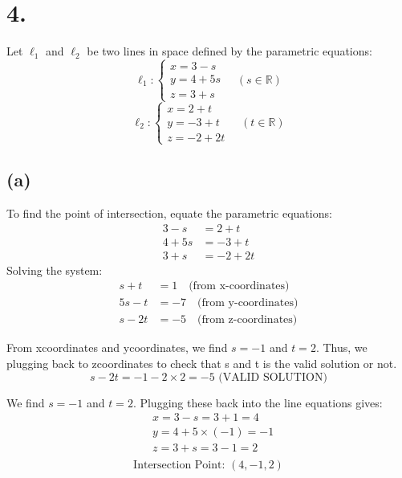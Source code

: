 \documentclass{article}
\begin{document}
    \section*{4. }
        Let \(\ell_1\) and \(\ell_2\) be two lines in space defined by the parametric equations:
        \[
        \ell_1 : \begin{cases}
        x = 3 - s \\
        y = 4 + 5s \\
        z = 3 + s 
        \end{cases}
        \quad (s \in \mathbb{R})
        \]
        \[
        \ell_2 : \begin{cases}
        x = 2 + t \\
        y = -3 + t \\
        z = -2 + 2t
        \end{cases}
        \quad (t \in \mathbb{R})
        \]

        \subsection*{(a)}
        To find the point of intersection, equate the parametric equations:
        \begin{align*}
        3 - s &= 2 + t \\
        4 + 5s &= -3 + t \\
        3 + s &= -2 + 2t 
        \end{align*}
        Solving the system:
        \begin{align*}
            s + t &= 1 \quad \text{(from x-coordinates)} \\
            5s - t &= -7 \quad \text{(from y-coordinates)} \\
            s - 2t &= -5 \quad \text{(from z-coordinates)}
        \end{align*}

        From x\-coordinates and y\-coordinates, we find \(s = -1\) and \(t = 2\). Thus, we plugging back to z\-coordinates to check that s and t is the valid solution or not.
        \[s - 2t = -1 - 2\times 2 = -5 \text{  (VALID SOLUTION)}\]

        We find \(s = -1\) and \(t = 2\). Plugging these back into the line equations gives:
        \begin{align}
            &x = 3 - s = 3 + 1 = 4 \\
            &y = 4 + 5 \times (-1) = -1 \\
            &z = 3 + s = 3 - 1 = 2 \\
        \end{align}
        \[
        \text{Intersection Point: } (4, -1, 2)
        \]
\end{document}
